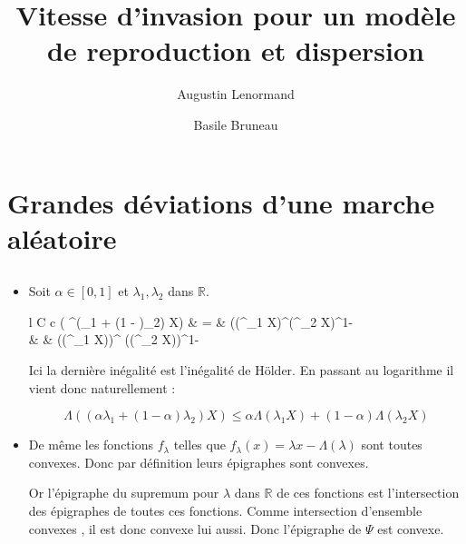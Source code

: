 \documentclass[12pt,titlepage=true]{article}
\title{Vitesse d'invasion pour un modèle de reproduction et dispersion}
\author{Augustin Lenormand \and Basile Bruneau}
\renewcommand\labelitemi{\textbullet}
\newcommand{\esp}{\mathbb{E}}
\renewcommand{\exp}{\mathrm{e}^}
\begin{document}
	\maketitle

	\section{Grandes déviations d'une marche aléatoire}
		\subsection{}\setcounter{equation}{0} %
			
			\renewcommand\labelitemi{\textbullet}
			
			\begin{itemize}
	
				\item	Soit $\alpha\in [0,1]$ et $\lambda_1, \lambda_2$ dans $\mathbb{R}$.
	
						\begin{IEEEeqnarray*}{l C c}
							\esp( \exp{(\alpha \lambda_1 + (1 - \alpha)\lambda_2) X}) &     =     &  \esp((\exp{\lambda_1 X})^{\alpha}(\exp{\lambda_2 X})^{1-\alpha}\\
																   					  & \leqslant & (\esp(\exp{\lambda_1 X}))^{\alpha} (\esp(\exp{\lambda_2 X}))^{1- \alpha}
						\end{IEEEeqnarray*}
	
	
						Ici la dernière inégalité est l'inégalité de Hölder. En passant au logarithme il vient donc naturellement :	
	
						\begin{equation*}
							\Lambda((\alpha \lambda_1 + (1 - \alpha)\lambda_2) X) \leqslant \alpha \Lambda(\lambda_1 X) + (1-\alpha) \Lambda(\lambda_2 X)
						\end{equation*}
		
		
				\item	De même les fonctions $f_\lambda$ telles que $f_\lambda (x)=\lambda x - \Lambda (\lambda)$ sont toutes convexes. Donc par définition leurs épigraphes sont convexes.
			
						Or l'épigraphe du supremum pour $\lambda$ dans $\mathbb{R}$ de ces fonctions est l'intersection des épigraphes de toutes ces fonctions. Comme intersection d'ensemble convexes , il est donc convexe lui aussi. Donc l'épigraphe de $\Psi$ est convexe.
		

\end{itemize}
\end{document}
